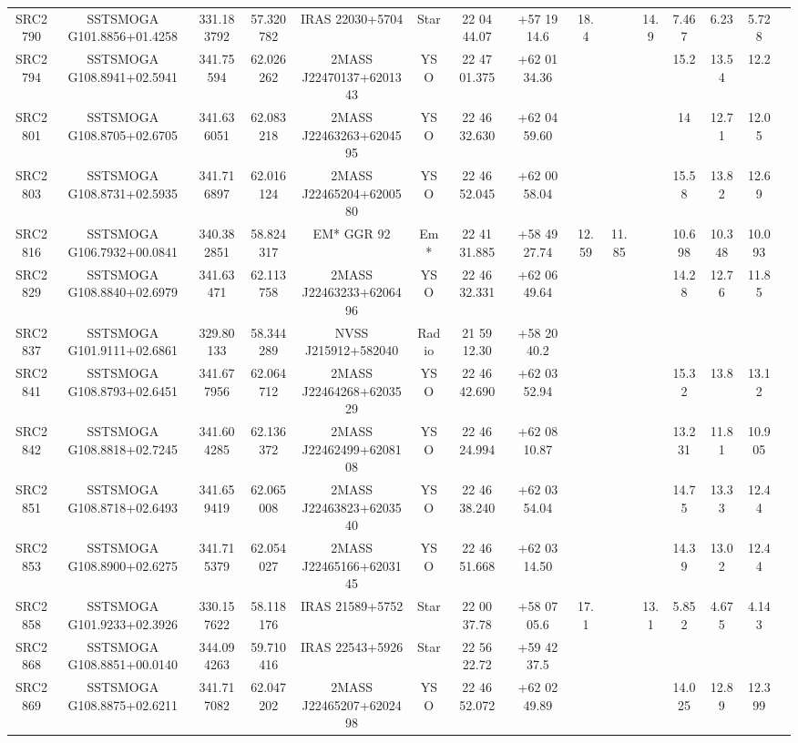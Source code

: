 \begin{table}
\begin{tabular}{ccccccccccccccc}
SRC2790 & SSTSMOGA G101.8856+01.4258 & 331.183792 & 57.320782 & IRAS 22030+5704 & Star & 22 04 44.07 & +57 19 14.6 & 18.4 &  & 14.9 & 7.467 & 6.23 & 5.728 &  \\
SRC2794 & SSTSMOGA G108.8941+02.5941 & 341.75594 & 62.026262 & 2MASS J22470137+6201343 & YSO & 22 47 01.375 & +62 01 34.36 &  &  &  & 15.2 & 13.54 & 12.2 &  \\
SRC2801 & SSTSMOGA G108.8705+02.6705 & 341.636051 & 62.083218 & 2MASS J22463263+6204595 & YSO & 22 46 32.630 & +62 04 59.60 &  &  &  & 14 & 12.71 & 12.05 &  \\
SRC2803 & SSTSMOGA G108.8731+02.5935 & 341.716897 & 62.016124 & 2MASS J22465204+6200580 & YSO & 22 46 52.045 & +62 00 58.04 &  &  &  & 15.58 & 13.82 & 12.69 &  \\
SRC2816 & SSTSMOGA G106.7932+00.0841 & 340.382851 & 58.824317 & EM* GGR   92 & Em* & 22 41 31.885 & +58 49 27.74 & 12.59 & 11.85 &  & 10.698 & 10.348 & 10.093 &  \\
SRC2829 & SSTSMOGA G108.8840+02.6979 & 341.63471 & 62.113758 & 2MASS J22463233+6206496 & YSO & 22 46 32.331 & +62 06 49.64 &  &  &  & 14.28 & 12.76 & 11.85 &  \\
SRC2837 & SSTSMOGA G101.9111+02.6861 & 329.80133 & 58.344289 & NVSS J215912+582040 & Radio & 21 59 12.30 & +58 20 40.2 &  &  &  &  &  &  &  \\
SRC2841 & SSTSMOGA G108.8793+02.6451 & 341.677956 & 62.064712 & 2MASS J22464268+6203529 & YSO & 22 46 42.690 & +62 03 52.94 &  &  &  & 15.32 & 13.8 & 13.12 &  \\
SRC2842 & SSTSMOGA G108.8818+02.7245 & 341.604285 & 62.136372 & 2MASS J22462499+6208108 & YSO & 22 46 24.994 & +62 08 10.87 &  &  &  & 13.231 & 11.81 & 10.905 &  \\
SRC2851 & SSTSMOGA G108.8718+02.6493 & 341.659419 & 62.065008 & 2MASS J22463823+6203540 & YSO & 22 46 38.240 & +62 03 54.04 &  &  &  & 14.75 & 13.33 & 12.44 &  \\
SRC2853 & SSTSMOGA G108.8900+02.6275 & 341.715379 & 62.054027 & 2MASS J22465166+6203145 & YSO & 22 46 51.668 & +62 03 14.50 &  &  &  & 14.39 & 13.02 & 12.44 &  \\
SRC2858 & SSTSMOGA G101.9233+02.3926 & 330.157622 & 58.118176 & IRAS 21589+5752 & Star & 22 00 37.78 & +58 07 05.6 & 17.1 &  & 13.1 & 5.852 & 4.675 & 4.143 &  \\
SRC2868 & SSTSMOGA G108.8851+00.0140 & 344.094263 & 59.710416 & IRAS 22543+5926 & Star & 22 56 22.72 & +59 42 37.5 &  &  &  &  &  &  &  \\
SRC2869 & SSTSMOGA G108.8875+02.6211 & 341.717082 & 62.047202 & 2MASS J22465207+6202498 & YSO & 22 46 52.072 & +62 02 49.89 &  &  &  & 14.025 & 12.89 & 12.399 &  \\

\end{tabular}
\end{table}
